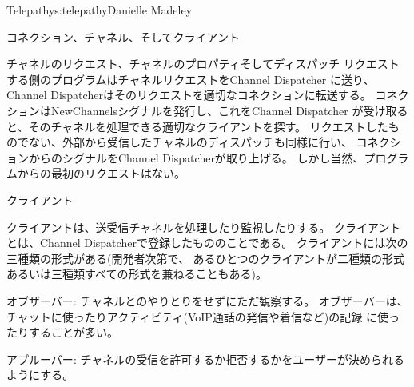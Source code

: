 \begin{aosachapter}{Telepathy}{s:telepathy}{Danielle Madeley}
\begin{aosasect1}{コネクション、チャネル、そしてクライアント}
\begin{aosasect2}{チャネルのリクエスト、チャネルのプロパティそしてディスパッチ}
リクエストする側のプログラムはチャネルリクエストをChannel Dispatcher
に送り、Channel Dispatcherはそのリクエストを適切なコネクションに転送する。
コネクションはNewChannelsシグナルを発行し、これをChannel Dispatcher
が受け取ると、そのチャネルを処理できる適切なクライアントを探す。
リクエストしたものでない、外部から受信したチャネルのディスパッチも同様に行い、
コネクションからのシグナルをChannel Dispatcherが取り上げる。
しかし当然、プログラムからの最初のリクエストはない。

\end{aosasect2}

\begin{aosasect2}{クライアント}

クライアントは、送受信チャネルを処理したり監視したりする。
クライアントとは、Channel Dispatcherで登録したもののことである。
クライアントには次の三種類の形式がある(開発者次第で、
あるひとつのクライアントが二種類の形式あるいは三種類すべての形式を兼ねることもある)。

\begin{aosadescription}

  \item{オブザーバー}: チャネルとのやりとりをせずにただ観察する。
  オブザーバーは、チャットに使ったりアクティビティ(VoIP通話の発信や着信など)の記録
  に使ったりすることが多い。

  \item{アプルーバー}: チャネルの受信を許可するか拒否するかをユーザーが決められるようにする。


\end{aosadescription}
\end{aosasect2}
\end{aosasect1}
\end{aosachapter}
